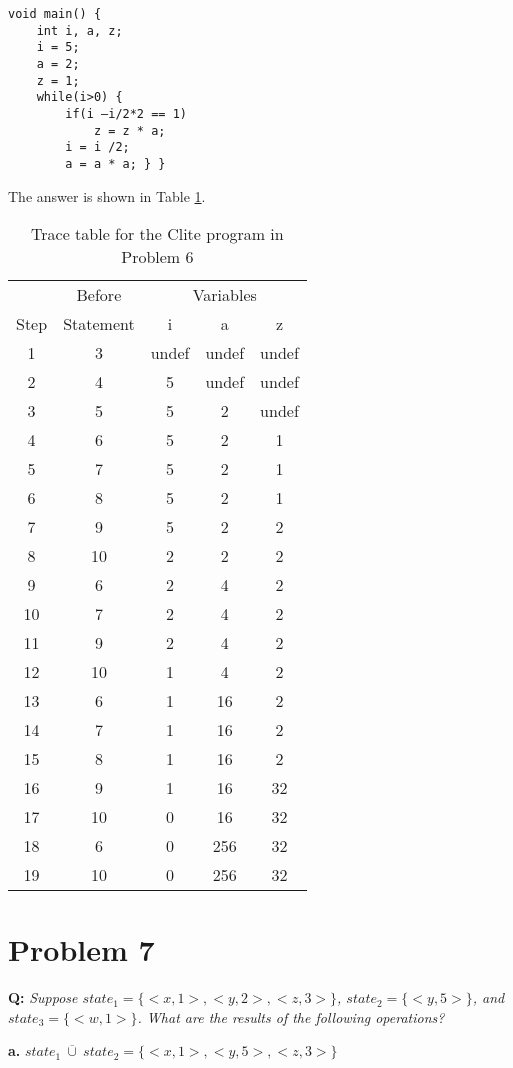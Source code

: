 \documentclass{article}
\begin{document}
\begin{lstlisting}
void main() {
    int i, a, z;
    i = 5;
    a = 2;
    z = 1;
    while(i>0) {
        if(i –i/2*2 == 1)
            z = z * a;
        i = i /2;
        a = a * a; } }
\end{lstlisting}

The answer is shown in Table \ref{t:tracetable}.

\begin{table}[htbp]
\centering
\begin{tabular}{ccccc}
\toprule
 & Before & \multicolumn{3}{c}{Variables} \\
\cline{3-5}
Step & Statement & i & a & z \\
\midrule
1 & 3 & undef & undef & undef \\
2 & 4 & 5 & undef & undef \\
3 & 5 & 5 & 2 & undef \\
4 & 6 & 5 & 2 & 1 \\
5 & 7 & 5 & 2 & 1 \\
6 & 8 & 5 & 2 & 1 \\
7 & 9 & 5 & 2 & 2 \\
8 & 10 & 2 & 2 & 2 \\
9 & 6 & 2 & 4 & 2 \\
10 & 7 & 2 & 4 & 2 \\
11 & 9 & 2 & 4 & 2 \\
12 & 10 & 1 & 4 & 2 \\
13 & 6 & 1 & 16 & 2 \\
14 & 7 & 1 & 16 & 2 \\
15 & 8 & 1 & 16 & 2 \\
16 & 9 & 1 & 16 & 32 \\
17 & 10 & 0 & 16 & 32 \\
18 & 6 & 0 & 256 & 32 \\
19 & 10 & 0 & 256 & 32 \\
\bottomrule
\end{tabular}
\caption{Trace table for the Clite program in Problem 6}
\label{t:tracetable}
\end{table}

\section*{Problem 7}
\textbf{Q:} \textit{Suppose $state_1 = \{<x, 1>, <y, 2>, <z, 3>\}$, $state_2 = \{<y, 5>\}$, and $state_3 = \{<w, 1>\}$. What are the results of the following operations?}

\textbf{a.} $state_1\ \overline{\cup}\ state_2 = \{<x, 1>, <y, 5>, <z, 3>\}$
\end{document}
